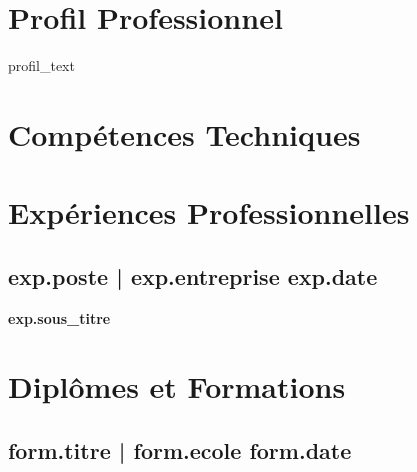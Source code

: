 \documentclass[10pt, a4paper]{article}
\begin{document}
{%
\section{Profil Professionnel}
{{ profil_text }}
\vspace{0.1cm}
{%

{%
\section{Compétences Techniques}
\vspace{0.1cm}
{%

{%
\section{Expériences Professionnelles}
{%
\subsection*{ {{ exp.poste }} | {{ exp.entreprise }} \hfill \textbf{ {{ exp.date }} } }
{%
\textbf{ {{ exp.sous_titre }} }
{%
{%
\vspace{0.1cm}
{%

{%
\section{Diplômes et Formations}
{%
\subsection*{ {{ form.titre }} | {{ form.ecole }} \hfill \textbf{ {{ form.date }} } }
{%
\vspace{0.1cm}
{%

}}}}}}}}}}}}}}
\end{document}
